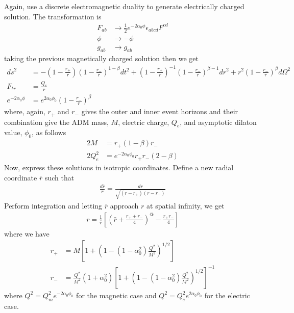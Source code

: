 \documentclass[prd]{revtex4}
\begin{document}
Again, use a discrete electromagnetic duality to generate electrically charged solution. The transformation is
\begin{align}
F_{ab} &\rightarrow \frac{1}{2} e^{-2 \alpha_0 \phi} \epsilon_{abcd} F^{cd} \\
\phi &\rightarrow -\phi \\
g_{ab} &\rightarrow g_{ab}
\end{align}
taking the previous magnetically charged solution then we get
\begin{align}
ds^2 &= -\left(1-\frac{r_+}{r} \right) \left(1-\frac{r_-}{r} \right)^{1-\beta} dt^2 + \left(1-\frac{r_+}{r} \right)^{-1} \left(1-\frac{r_-}{r} \right)^{\beta-1} dr^2 + r^2 \left(1-\frac{r_-}{r}\right)^\beta d \Omega^2 \\
F_{tr} &= \frac{Q_e}{r}  \\
e^{-2 \alpha_0 \phi} &= e^{2 \alpha_0 \phi_0} \left(1-\frac{r_-}{r} \right)^\beta
\end{align}
where, again, $r_+$ and $r_-$ gives the outer and inner event horizons and their combination give the ADM mass, $M$, electric charge, $Q_e$, and asymptotic dilaton value, $\phi_0$, as follows
\begin{align}
2M &= r_+ (1-\beta)r_- \\
2Q_e^2 &= e^{-2\alpha_0 \phi_0} r_+ r_- (2-\beta)
\end{align}
Now, express these solutions in isotropic coordinates. Define a new radial coordinate $\bar{r}$ such that
\begin{align}
\frac{d\bar{r}}{\bar{r}} = \frac{dr}{\sqrt{(r-r_+)(r-r_-)}}
\end{align}
Perform integration and letting $\bar{r}$ approach $r$ at spatial infinity, we get
\begin{align}
r=\frac{1}{\bar{r}} \left[ \left( \bar{r} + \frac{r_+ + r_-}{4} \right)^@ - \frac{r_+ r_-}{4} \right]
\end{align}
where we have
\begin{align}
r_+ &= M \left[1+\left(1-(1-\alpha_0^2) \frac{Q^2}{M^2} \right)^{1/2} \right] \\
r_- &= \frac{Q^2}{M^2}(1+\alpha_0^2) \left[1+\left(1-(1-\alpha_0^2) \frac{Q^2}{M^2} \right)^{1/2} \right]^{-1}
\end{align}
where $Q^2 = Q_m^2 e^{-2 \alpha_0 \phi_0}$ for the magnetic case and $Q^2 = Q_e^2 e^{2 \alpha_0 \phi_0}$ for the electric case.
\end{document}
